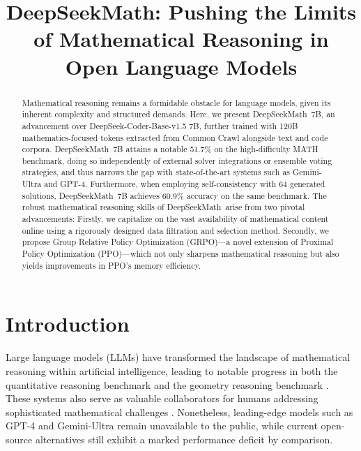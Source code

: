 \title{DeepSeekMath: Pushing the Limits of Mathematical Reasoning in Open Language Models}

\begin{abstract}
Mathematical reasoning remains a formidable obstacle for language models, given its inherent complexity and structured demands. Here, we present DeepSeekMath~7B, an advancement over DeepSeek-Coder-Base-v1.5 7B, further trained with 120B mathematics-focused tokens extracted from Common Crawl alongside text and code corpora. DeepSeekMath~7B attains a notable 51.7\% on the high-difficulty MATH benchmark, doing so independently of external solver integrations or ensemble voting strategies, and thus narrows the gap with state-of-the-art systems such as Gemini-Ultra and GPT-4. Furthermore, when employing self-consistency with 64 generated solutions, DeepSeekMath~7B achieves 60.9\% accuracy on the same benchmark. The robust mathematical reasoning skills of DeepSeekMath~arise from two pivotal advancements: Firstly, we capitalize on the vast availability of mathematical content online using a rigorously designed data filtration and selection method. Secondly, we propose Group Relative Policy Optimization (GRPO)—a novel extension of Proximal Policy Optimization (PPO)—which not only sharpens mathematical reasoning but also yields improvements in PPO's memory efficiency.
\end{abstract}

\section{Introduction}

Large language models (LLMs) have transformed the landscape of mathematical reasoning within artificial intelligence, leading to notable progress in both the quantitative reasoning benchmark \citep{MATH} and the geometry reasoning benchmark \citep{trinh2024solving}. These systems also serve as valuable collaborators for humans addressing sophisticated mathematical challenges \citep{tao}. Nonetheless, leading-edge models such as GPT-4 \citep{gpt4} and Gemini-Ultra \citep{gemini} remain unavailable to the public, while current open-source alternatives still exhibit a marked performance deficit by comparison.

